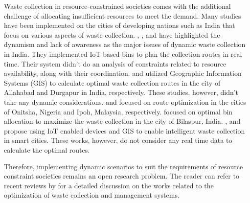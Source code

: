 \documentclass[12pt]{article}
\begin{document}
Waste collection in resource-constrained societies comes with the additional challenge of allocating insufficient resources to meet the demand. Many studies have been implemented on the cities of developing nations such as India that focus on various aspects of waste collection. \cite{dugdhe2016efficient}, \cite{chaudhari2018solid}, and \cite{badve2020garbage} have highlighted the dynamism and lack of awareness as the major issues of dynamic waste collection in India. They implemented IoT based bins to plan the collection routes in real time. Their system didn't do an analysis of constraints related to resource availability, along with their coordination. \cite{chaudhary2019gis} and \cite{sk2020optimal} utilized Geographic Information Systems (GIS) to calculate optimal waste collection routes in the city of Allahabad and Durgapur in India, respectively. These studies, however, didn't take any dynamic considerations.\cite{ogwueleke2009route} and \cite{malakahmad2014solid} focused on route optimization in the cities of Onitsha, Nigeria and Ipoh, Malaysia, respectively. \cite{rathore2020location} focused on optimal bin allocation to maximize the waste collection in the city of Bilaspur, India. \cite{vasagade2017dynamic},\cite{medvedev2015waste} and \cite{malapur2017iot} propose using IoT enabled devices and GIS to enable intelligent waste collection in smart cities. These works, however, do not consider any real time data to calculate the optimal routes.

Therefore, implementing dynamic scenarios to suit the requirements of resource constraint societies remains an open research problem. The reader can refer to recent reviews by \cite{belien2014municipal,sulemana2018optimal,abdallah2020artificial} for a detailed discussion on the works related to the optimization of waste collection and management systems.



\end{document}
